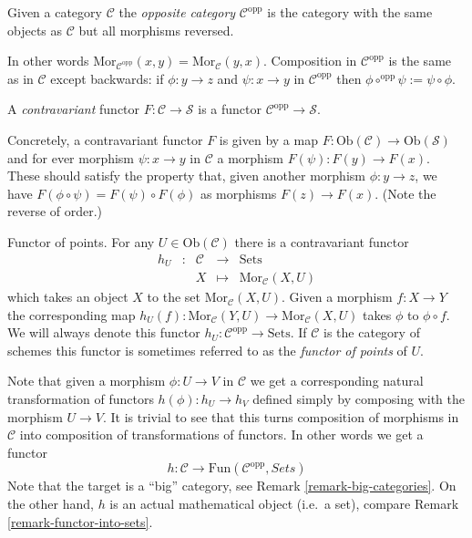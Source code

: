 \begin{definition}
\label{definition-opposite}
Given a category $\mathcal{C}$ the {\it opposite category}
$\mathcal{C}^{\text{opp}}$ is the category with the same objects
as $\mathcal{C}$ but all morphisms reversed.
\end{definition}

\noindent
In other
words $\text{Mor}_{\mathcal{C}^{\text{opp}}}(x,y) =
\text{Mor}_{\mathcal{C}}(y,x)$. Composition in $\mathcal{C}^{\text{opp}}$
is the same as in $\mathcal{C}$ except backwards: if $\phi : y \to z$ and
$\psi : x \to y$ in $\mathcal{C}^{\text{opp}}$ then
$\phi \circ^{\text{opp}} \psi := \psi \circ \phi$.

\begin{definition}
A {\it contravariant} functor $F\colon
\mathcal{C}\to \mathcal{S}$ is a functor $\mathcal{C}^{\text{opp}}\to
\mathcal{S}$.
\end{definition}

\noindent
Concretely, a contravariant functor $F$ is given
by a map $F : \text{Ob}(\mathcal{C}) \to 
\text{Ob}(\mathcal{S})$ and for ever morphism
$\psi : x \to y$ in $\mathcal{C}$ a morphism
$F(\psi) : F(y) \to F(x)$. These should satisfy the property
that, given another morphism
$\phi : y \to z$, we have $F(\phi \circ \psi)
= F(\psi) \circ F(\phi)$ as morphisms $F(z) \to F(x)$.
(Note the reverse of order.)

\begin{example}
\label{example-hom-functor}
Functor of points.
For any $U\in \text{Ob}(\mathcal{C})$ there is a contravariant
functor 
$$
\begin{matrix}
h_U & : & \mathcal{C} 
&
\longrightarrow
&
\text{Sets} \\
&&
X
&
\longmapsto
&
\text{Mor}_{\mathcal{C}}(X,U) 
\end{matrix}
$$
which takes an object $X$ to the set
$\text{Mor}_{\mathcal{C}}(X,U)$.
Given a morphism $f\colon X\to Y$ the corresponding map
$h_U(f)\colon
\text{Mor}_{\mathcal{C}}(Y,U)\to \text{Mor}_{\mathcal{C}}(X,U)$ takes
$\phi$ to $\phi\circ f$. We will always denote
this functor $h_U : \mathcal{C}^{\text{opp}} \to \text{Sets}$.
If $\mathcal{C}$ is the category of schemes this functor is
sometimes referred to as the
\emph{functor of points} of $U$.
\end{example}

\noindent
Note that given a morphism $\phi : U \to V$ in $\mathcal{C}$ we get a
corresponding natural transformation of functors
$h(\phi) : h_U \to h_V$ defined simply by composing with the morphism
$U \to V$. It is trivial to see that this turns
composition of morphisms in $\mathcal{C}$ into composition of
transformations of functors. In other words we get a functor
$$
h :
\mathcal{C}
\longrightarrow
\text{Fun}(\mathcal{C}^{\text{opp}}, \textit{Sets})
$$
Note that the target is a ``big'' category, see
Remark \ref{remark-big-categories}. On the other hand,
$h$ is an actual mathematical object (i.e.\ a set), compare Remark
\ref{remark-functor-into-sets}.

